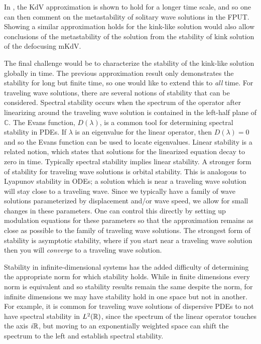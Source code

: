 In \cite{khan2017long}, the KdV approximation is shown to hold for a longer time scale, and so one can then comment on the metastability of solitary wave solutions in the FPUT. Showing a similar approximation holds for the kink-like solution would also allow conclusions of the metastability of the solution from the stability of kink solution of the defocusing mKdV.

The final challenge would be to characterize the stability of the kink-like solution globally in time. The previous approximation result only demonstrates the stability for long but finite time, so one would like to extend this to \emph{all} time. For traveling wave solutions, there are several notions of stability that can be considered. Spectral stability occurs when the spectrum of the operator after linearizing around the traveling wave solution is contained in the left-half plane of \(\mathbb C\). The Evans function, \(D(\lambda)\), is a common tool for determining spectral stability in PDEs. If \(\lambda\) is an eigenvalue for the linear operator, then \(D(\lambda) = 0\) and so the Evans function can be used to locate eigenvalues. Linear stability is a related notion, which states that solutions for the linearized equation decay to zero in time. Typically spectral stability implies linear stability. A stronger form of stability for traveling wave solutions is orbital stability. This is analogous to Lyapunov stability in ODEs; a solution which is near a traveling wave solution will stay close to a traveling wave. Since we typically have a family of wave solutions parameterized by displacement and/or wave speed, we allow for small changes in these parameters. One can control this directly by setting up modulation equations for these parameters so that the approximation remains as close as possible to the family of traveling wave solutions. The strongest form of stability is asymptotic stability, where if you start near a traveling wave solution then you will \emph{converge} to a traveling wave solution.

Stability in infinite-dimensional systems has the added difficulty of determining the appropriate norm for which stability holds. While in finite dimensions every norm is equivalent and so stability results remain the same despite the norm, for infinite dimensions we may have stability hold in one space but not in another.  For example, it is common for traveling wave solutions of dispersive PDEs to not have spectral stability in \(L^2(\mathbb{R})\), since the spectrum of the linear operator touches the axis \(i \mathbb{R}\), but moving to an exponentially weighted space can shift the spectrum to the left and establish spectral stability.

